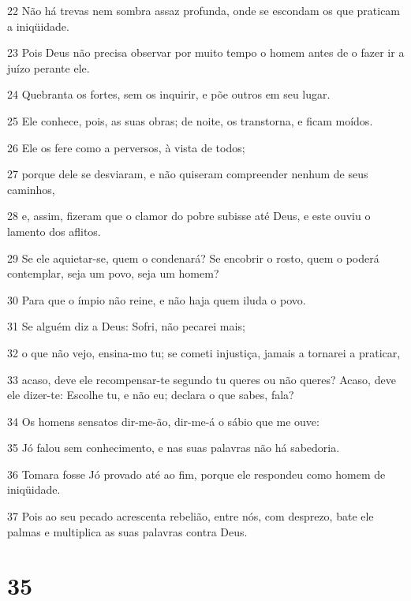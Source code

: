 \par 22 Não há trevas nem sombra assaz profunda, onde se escondam os que praticam a iniqüidade.
\par 23 Pois Deus não precisa observar por muito tempo o homem antes de o fazer ir a juízo perante ele.
\par 24 Quebranta os fortes, sem os inquirir, e põe outros em seu lugar.
\par 25 Ele conhece, pois, as suas obras; de noite, os transtorna, e ficam moídos.
\par 26 Ele os fere como a perversos, à vista de todos;
\par 27 porque dele se desviaram, e não quiseram compreender nenhum de seus caminhos,
\par 28 e, assim, fizeram que o clamor do pobre subisse até Deus, e este ouviu o lamento dos aflitos.
\par 29 Se ele aquietar-se, quem o condenará? Se encobrir o rosto, quem o poderá contemplar, seja um povo, seja um homem?
\par 30 Para que o ímpio não reine, e não haja quem iluda o povo.
\par 31 Se alguém diz a Deus: Sofri, não pecarei mais;
\par 32 o que não vejo, ensina-mo tu; se cometi injustiça, jamais a tornarei a praticar,
\par 33 acaso, deve ele recompensar-te segundo tu queres ou não queres? Acaso, deve ele dizer-te: Escolhe tu, e não eu; declara o que sabes, fala?
\par 34 Os homens sensatos dir-me-ão, dir-me-á o sábio que me ouve:
\par 35 Jó falou sem conhecimento, e nas suas palavras não há sabedoria.
\par 36 Tomara fosse Jó provado até ao fim, porque ele respondeu como homem de iniqüidade.
\par 37 Pois ao seu pecado acrescenta rebelião, entre nós, com desprezo, bate ele palmas e multiplica as suas palavras contra Deus.

\chapter{35}

